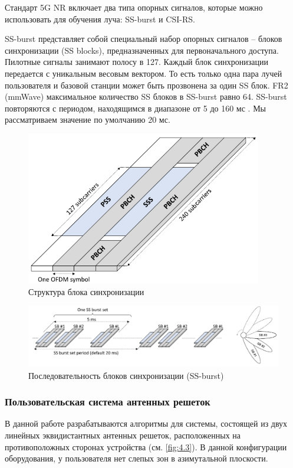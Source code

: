 Стандарт 5G NR включает два типа опорных сигналов, которые можно использовать для обучения луча: SS-burst
и CSI-RS.

SS-burst представляет собой специальный набор опорных сигналов -- блоков синхронизации (SS blocks), предназначенных для
первоначального доступа. Пилотные сигналы занимают полосу в 127. Каждый блок синхронизации
передается с уникальным весовым вектором. То есть только одна пара лучей пользователя и базовой станции может быть прозвонена за один SS блок.
FR2 (mmWave) максимальное количество SS блоков в SS-burst равно 64. SS-burst повторяются с периодом, находящимся  в диапазоне от 5 до 160 мс \cite{Dahlman2018}.
Мы рассматриваем значение по умолчанию 20 мс.

\begin{figure}[h!]
    \centering
    \includegraphics[width=0.4\linewidth]{figs/fig4.1}
    \caption{Структура блока синхронизации}
    \label{fig:4.1}
\end{figure}
\begin{figure}[h!]
    \centering
    \includegraphics[width=\linewidth]{figs/fig4.2}
    \caption{Последовательность блоков синхронизации (SS-burst)}
    \label{fig:4.2}
\end{figure}

\subsubsection{Пользовательская система антенных решеток}

В данной работе разрабатываются алгоритмы для системы, состоящей из двух линейных эквидистантных антенных решеток, расположенных на противоположных сторонах
устройства (см. \ref{fig:4.3}). В данной конфигурации оборудования, у пользователя нет слепых зон в азимутальной плоскости.


